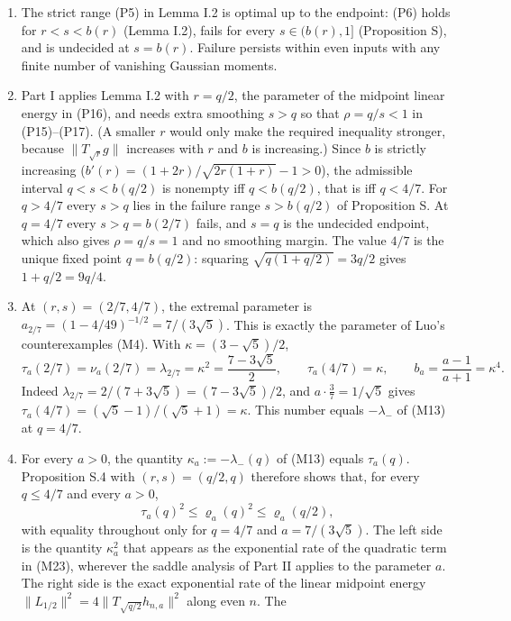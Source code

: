 \documentclass[
  british,
  10pt,
]{article}
\newcounter{none} %
\providecommand{\tightlist}{%
  \setlength{\itemsep}{0pt}\setlength{\parskip}{0pt}}
\begin{document}
\begin{enumerate}
\def\labelenumi{\arabic{enumi}.}
\tightlist
\item
  The strict range (P5) in Lemma I.2 is optimal up to the endpoint: (P6)
  holds for \(r<s<b(r)\) (Lemma I.2), fails for every \(s\in(b(r),1]\)
  (Proposition S), and is undecided at \(s=b(r)\). Failure persists
  within even inputs with any finite number of vanishing Gaussian
  moments.
\item
  Part I applies Lemma I.2 with \(r=q/2\), the parameter of the midpoint
  linear energy in (P16), and needs extra smoothing \(s>q\) so that
  \(\rho=q/s<1\) in (P15)--(P17). (A smaller \(r\) would only make the
  required inequality stronger, because \(\|T_{\sqrt r}g\|\) increases
  with \(r\) and \(b\) is increasing.) Since \(b\) is strictly
  increasing (\(b'(r)=(1+2r)/\sqrt{2r(1+r)}-1>0\)), the admissible
  interval \(q<s<b(q/2)\) is nonempty iff \(q<b(q/2)\), that is iff
  \(q<4/7\). For \(q>4/7\) every \(s>q\) lies in the failure range
  \(s>b(q/2)\) of Proposition S. At \(q=4/7\) every \(s>q=b(2/7)\)
  fails, and \(s=q\) is the undecided endpoint, which also gives
  \(\rho=q/s=1\) and no smoothing margin. The value \(4/7\) is the
  unique fixed point \(q=b(q/2)\): squaring \(\sqrt{q(1+q/2)}=3q/2\)
  gives \(1+q/2=9q/4\).
\item
  At \((r,s)=(2/7,4/7)\), the extremal parameter is
  \(a_{2/7}=(1-4/49)^{-1/2}=7/(3\sqrt5)\). This is exactly the parameter
  of Luo's counterexamples (M4). With \(\kappa=(3-\sqrt5)/2\), \[
  \tau_a(2/7)=\nu_a(2/7)=\lambda_{2/7}=\kappa^2=\frac{7-3\sqrt5}{2},\qquad
  \tau_a(4/7)=\kappa,
  \qquad b_a=\frac{a-1}{a+1}=\kappa^4.
  \tag{S9}
  \] Indeed \(\lambda_{2/7}=2/(7+3\sqrt5)=(7-3\sqrt5)/2\), and
  \(a\cdot\frac37=1/\sqrt5\) gives
  \(\tau_a(4/7)=(\sqrt5-1)/(\sqrt5+1)=\kappa\). This number equals
  \(-\lambda_-\) of (M13) at \(q=4/7\).
\item
  For every \(a>0\), the quantity \(\kappa_a:=-\lambda_-(q)\) of (M13)
  equals \(\tau_a(q)\). Proposition S.4 with \((r,s)=(q/2,q)\) therefore
  shows that, for every \(q\le4/7\) and every \(a>0\), \[
  \tau_a(q)^2\le\varrho_a(q)^2\le\varrho_a(q/2),
  \tag{S10}
  \] with equality throughout only for \(q=4/7\) and \(a=7/(3\sqrt5)\).
  The left side is the quantity \(\kappa_a^2\) that appears as the
  exponential rate of the quadratic term in (M23), wherever the saddle
  analysis of Part II applies to the parameter \(a\). The right side is
  the exact exponential rate of the linear midpoint energy
  \(\|L_{1/2}\|^2=4\|T_{\sqrt{q/2}}h_{n,a}\|^2\) along even \(n\). The

\end{enumerate}
\end{document}
